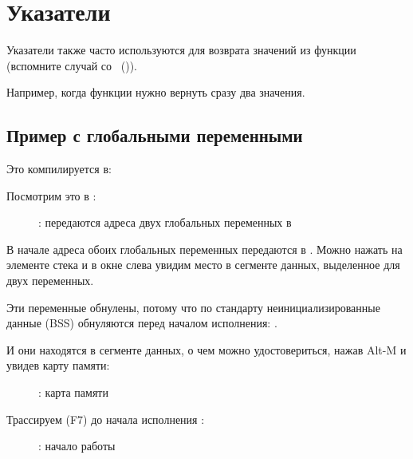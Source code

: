 \section{Указатели}
\myindex{\CLanguageElements!\Pointers}
\label{label_pointers}

Указатели также часто используются для возврата значений из функции (вспомните случай со \scanf{}~()).

Например, когда функции нужно вернуть сразу два значения.

\subsection{Пример с глобальными переменными}



Это компилируется в:



\myindex{\olly}
\clearpage
Посмотрим это в \olly:

\begin{figure}[H]
\centering
{}
\caption{\olly: передаются адреса двух глобальных переменных в \ttfone}
\label{fig:pointers_olly_global_1}
\end{figure}

В начале адреса обоих глобальных переменных передаются в \ttfone.
Можно нажать  на элементе стека и в окне слева 
увидим место в сегменте данных, выделенное для двух переменных.

Эти переменные обнулены, потому что по стандарту неинициализированные данные (\ac{BSS}) 
обнуляются перед началом исполнения: .

\clearpage

И они находятся в сегменте данных, о чем можно удостовериться, нажав Alt-M и увидев карту памяти:

\begin{figure}[H]
\centering
{}
\caption{\olly: карта памяти}
\label{fig:pointers_olly_global_5}
\end{figure}

\clearpage
Трассируем (F7) до начала исполнения \ttfone: 

\begin{figure}[H]
\centering
{}
\caption{\olly: начало работы \ttfone}
\label{fig:pointers_olly_global_2}
\end{figure}

